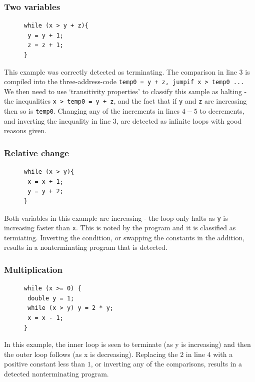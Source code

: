 \documentclass[12pt,a4paper]{article}
\begin{document}
\subsubsection{Two variables \cite[A.6]{tra}}

\begin{figure}
\centering
\begin{lstlisting}[frame=tlrb,language=myLang]
while (x > y + z){
 y = y + 1;
 z = z + 1;
}
\end{lstlisting}
\end{figure}
This example was correctly detected as terminating.
The comparison in line $3$ is compiled into the three-address-code \texttt{temp0 = y + z, jumpif x > temp0 ...}
We then need to use `transitivity properties' to classify this sample as halting - the inequalities \texttt{x > temp0 = y + z},
and the fact that if \texttt{y} and \texttt{z} are increasing then so is \texttt{temp0}.
Changing any of the increments in lines $4-5$ to decrements, and inverting the inequality in line $3$, are detected as infinite loops with good reasons given.

\subsubsection{Relative change \cite[A.8]{tra}}

\begin{figure}
\centering
\begin{lstlisting}[frame=tlrb,language=myLang]
while (x > y){
 x = x + 1;
 y = y + 2;
}
\end{lstlisting}
\end{figure}
Both variables in this example are increasing - the loop only halts as \texttt{y} is increasing faster than \texttt{x}.
This is noted by the program and it is classified as termiating. Inverting the condition, or swapping the constants in the addition,
results in a nonterminating program that is detected.

\pagebreak
\subsubsection{Multiplication \cite[C.1]{tra}}

\begin{figure}
\centering
\begin{lstlisting}[frame=tlrb,language=myLang]
while (x >= 0) {
 double y = 1;
 while (x > y) y = 2 * y;
 x = x - 1;
}
\end{lstlisting}
\end{figure}
In this example, the inner loop is seen to terminate (as y is increasing) and then the outer loop follows (as x is decreasing).
Replacing the $2$ in line $4$ with a positive constant less than $1$, or inverting any of the comparisons, results in a detected nonterminating program.
\end{document}
